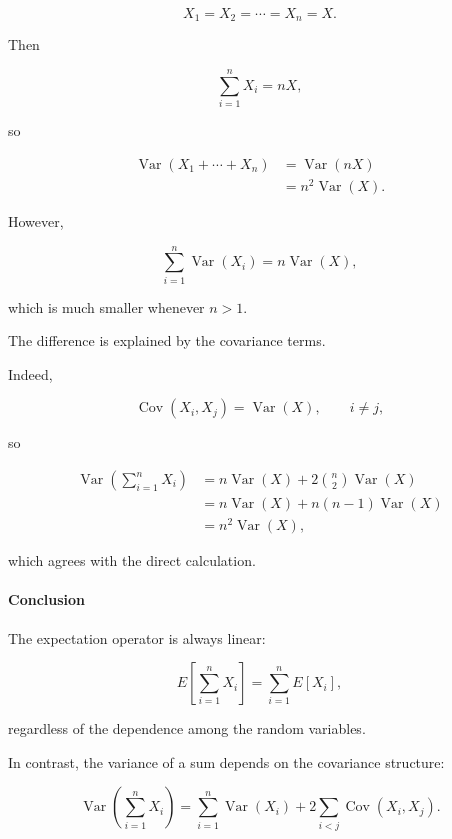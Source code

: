 \documentclass[11pt]{article}
\begin{document}
\begin{mdframed}[
		linewidth=0.8pt,
		roundcorner=6pt,
		backgroundcolor=gray!5,
		linecolor=gray!60,
		innertopmargin=10pt,
		innerbottommargin=10pt,
		innerleftmargin=10pt,
		innerrightmargin=10pt
		]
		\[
		X_1=X_2=\cdots=X_n=X.
		\]
		
		Then
		
		\[
		\sum_{i=1}^{n}X_i=nX,
		\]
		
		so
		
		\[
		\begin{aligned}
			\operatorname{Var}(X_1+\cdots+X_n)
			&=
			\operatorname{Var}(nX)
			\\[0.3cm]
			&=
			n^2\operatorname{Var}(X).
		\end{aligned}
		\]
		
		However,
		
		\[
		\sum_{i=1}^{n}
		\operatorname{Var}(X_i)
		=
		n\operatorname{Var}(X),
		\]
		
		which is much smaller whenever \(n>1\).
		
		The difference is explained by the covariance terms.
		
		Indeed,
		
		\[
		\operatorname{Cov}(X_i,X_j)
		=
		\operatorname{Var}(X),
		\qquad
		i\neq j,
		\]
		
		so
		
		\[
		\begin{aligned}
			\operatorname{Var}
			\!\left(
			\sum_{i=1}^{n}X_i
			\right)
			&=
			n\operatorname{Var}(X)
			+
			2
			\binom{n}{2}
			\operatorname{Var}(X)
			\\[0.3cm]
			&=
			n\operatorname{Var}(X)
			+
			n(n-1)\operatorname{Var}(X)
			\\[0.3cm]
			&=
			n^2\operatorname{Var}(X),
		\end{aligned}
		\]
		
		which agrees with the direct calculation.
		
		\bigskip
		
		\paragraph{Conclusion}
		
		The expectation operator is always linear:
		
		\[
		\boxed{
			E\!\left[
			\sum_{i=1}^{n}X_i
			\right]
			=
			\sum_{i=1}^{n}E[X_i],
		}
		\]
		
		regardless of the dependence among the random variables.
		
		In contrast, the variance of a sum depends on the covariance structure:
		
		\[
		\boxed{
			\operatorname{Var}
			\!\left(
			\sum_{i=1}^{n}X_i
			\right)
			=
			\sum_{i=1}^{n}\operatorname{Var}(X_i)
			+
			2\sum_{i<j}\operatorname{Cov}(X_i,X_j).
		}
		\]
		

\end{mdframed}
\end{document}

